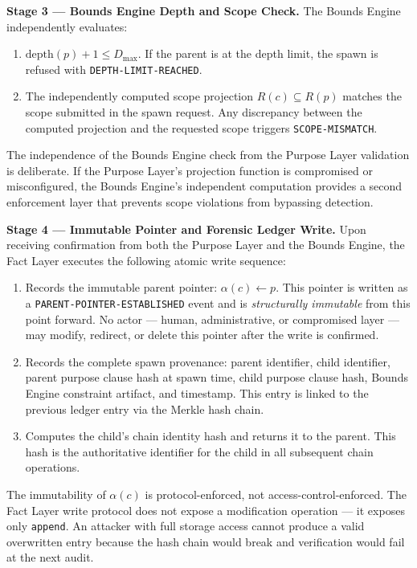 \bigskip
\noindent\textbf{Stage 3 — Bounds Engine Depth and Scope Check.} The Bounds Engine independently evaluates:

\begin{enumerate}
  \item[(BE-V1)] $\mathrm{depth}(p) + 1 \leq D_{\max}$. If the parent is at the depth limit, the spawn is refused with \texttt{DEPTH-LIMIT-REACHED}.

  \item[(BE-V2)] The independently computed scope projection $R(c) \subseteq R(p)$ matches the scope submitted in the spawn request. Any discrepancy between the computed projection and the requested scope triggers \texttt{SCOPE-MISMATCH}.
\end{enumerate}

The independence of the Bounds Engine check from the Purpose Layer validation is deliberate. If the Purpose Layer's projection function is compromised or misconfigured, the Bounds Engine's independent computation provides a second enforcement layer that prevents scope violations from bypassing detection.

\bigskip
\noindent\textbf{Stage 4 — Immutable Pointer and Forensic Ledger Write.} Upon receiving confirmation from both the Purpose Layer and the Bounds Engine, the Fact Layer executes the following atomic write sequence:

\begin{enumerate}
  \item[(FL-W1)] Records the immutable parent pointer: $\alpha(c) \gets p$. This pointer is written as a \texttt{PARENT-POINTER-ESTABLISHED} event and is \emph{structurally immutable} from this point forward. No actor — human, administrative, or compromised layer — may modify, redirect, or delete this pointer after the write is confirmed.

  \item[(FL-W2)] Records the complete spawn provenance: parent identifier, child identifier, parent purpose clause hash at spawn time, child purpose clause hash, Bounds Engine constraint artifact, and timestamp. This entry is linked to the previous ledger entry via the Merkle hash chain.

  \item[(FL-W3)] Computes the child's chain identity hash and returns it to the parent. This hash is the authoritative identifier for the child in all subsequent chain operations.
\end{enumerate}

The immutability of $\alpha(c)$ is protocol-enforced, not access-control-enforced. The Fact Layer write protocol does not expose a modification operation — it exposes only \texttt{append}. An attacker with full storage access cannot produce a valid overwritten entry because the hash chain would break and verification would fail at the next audit.

